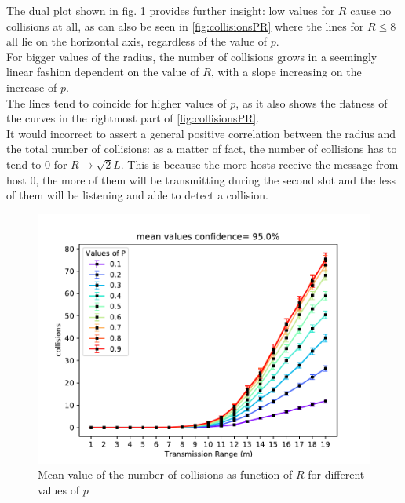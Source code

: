The dual plot shown in fig. \ref{fig:collisionsRP} provides further insight: low values for $R$ cause no collisions at all, as can also be seen in \ref{fig:collisionsPR} where the lines for $R \leq 8$ all lie on the horizontal axis, regardless of the value of $p$.\\
For bigger values of the radius, the number of collisions grows in a seemingly linear fashion dependent on the value of $R$, with a slope increasing on the increase of $p$.\\
The lines tend to coincide for higher values of $p$, as it also shows the flatness of the curves in the rightmost part of \ref{fig:collisionsPR}.\\
It would incorrect to assert a general positive correlation between the radius and the total number of collisions: as a matter of fact, the number of collisions has to tend to 0 for $R \to \sqrt{2}L$. This is because the more hosts receive the message from host 0, the more of them will be transmitting during the second slot and the less of them will be listening and able to detect a collision.
\begin{figure}[H]
    \begin{center}
        \includegraphics[scale=.65,trim={0 0 0 0.8cm},clip]{img/big_collisions_r_mean_95.0.pdf}
    \end{center}
    \vspace*{-0.5cm}
    \caption{Mean value of the number of collisions as function of $R$ for different values of $p$}
    \label{fig:collisionsRP}
\end{figure}
